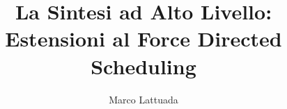 \documentclass[total,pdf,mulab,nocolorBG]{prosper}
\title{La Sintesi ad Alto Livello: \\ Estensioni al Force Directed Scheduling}
\subtitle{}
\author{Marco Lattuada}
\begin{document}
\maketitlemulab
























\end{document}
